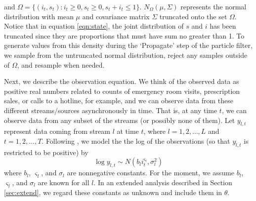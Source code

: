 \documentclass{elsarticle}
\begin{document}
\noindent and $\Omega = \{(i_t,s_t): i_t \ge 0, s_t \ge 0, s_t + i_t \le 1\}$. $N_{\Omega}(\mu,\Sigma)$ represents the normal distribution with mean $\mu$ and covariance matrix $\Sigma$ truncated onto the set $\Omega$. Notice that in equation \eqref{eqn:state}, the joint distribution of $s$ and $i$ has been truncated since they are proportions that must have sum no greater than 1. To generate values from this density during the `Propagate' step of the particle filter, we sample from the untruncated normal distribution, reject any samples outside of $\Omega$, and resample when needed.

%


Next, we describe the observation equation. We think of the observed data as positive real numbers related to counts of emergency room visits, prescription sales, or calls to a hotline, for example, and we can observe data from these different streams/sources asynchronously in time. That is, at any time $t$, we can observe data from any subset of the streams (or possibly none of them). Let $y_{l,t}$ represent data coming from stream $l$ at time $t$, where $l = 1,2,\ldots,L$ and $t = 1,2,\ldots,T$. Following \citet{skvortsov2012monitoring}, we model the the log of the observations (so that $y_{l,t}$ is restricted to be positive) by
\begin{equation}
\log y_{l,t} \sim N\left(b_li_t^{\varsigma_l},\sigma_l^2\right) \label{eqn:obs}
\end{equation}
where $b_l$, $\varsigma_l$, and $\sigma_l$ are nonnegative constants. For the moment, we assume $b_l$, $\varsigma_l$, and $\sigma_l$ are known for all $l$. In an extended analysis described in Section \ref{sec:extend}, we regard these constants as unknown and include them in $\theta$.
\end{document}
